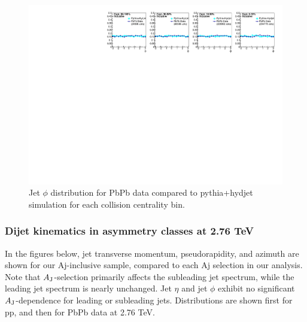  
  \begin{figure}[h!]
 \begin{center}
 \includegraphics[width=1\textwidth]{figures/Appendices/JetPhi_PbPb_Hydjet.pdf}
 \caption{Jet $\phi$ distribution for PbPb data compared to {\sc pythia+hydjet} simulation for each collision centrality bin.}
 \label{fig:PbPbJetPhi2} 
 \end{center}
 \end{figure}

  
 \subsubsection{Dijet kinematics in asymmetry classes at 2.76 TeV}

In the figures below, jet transverse momentum, pseudorapidity, and azimuth are shown for our Aj-inclusive sample, compared to each Aj selection in our analysis.  Note that $A_{\rm J}$-selection primarily affects the subleading jet spectrum, while the leading jet spectrum is nearly unchanged.  Jet $\eta$ and jet $\phi$ exhibit no significant $A_{\rm J}$-dependence for leading or subleading jets.  Distributions are shown first for pp, and then for PbPb data at 2.76 TeV.








